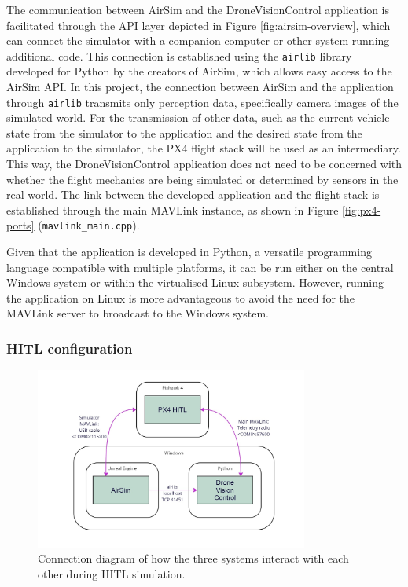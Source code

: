 The communication between AirSim and the DroneVisionControl application is facilitated through the API layer depicted in Figure \ref{fig:airsim-overview}, which can connect the simulator with a companion computer or other system running additional code. This connection is established using the \texttt{airlib} library developed for Python by the creators of AirSim, which allows easy access to the AirSim API. In this project, the connection between AirSim and the application through \texttt{airlib} transmits only perception data, specifically camera images of the simulated world. 
For the transmission of other data, such as the current vehicle state from the simulator to the application and the desired state from the application to the simulator, the PX4 flight stack will be used as an intermediary. This way, the DroneVisionControl application does not need to be concerned with whether the flight mechanics are being simulated or determined by sensors in the real world. The link between the developed application and the flight stack is established through the main MAVLink instance, as shown in Figure \ref{fig:px4-ports} (\texttt{mavlink\_main.cpp}).

Given that the application is developed in Python, a versatile programming language compatible with multiple platforms, it can be run either on the central Windows system or within the virtualised Linux subsystem. However, running the application on Linux is more advantageous to avoid the need for the MAVLink server to broadcast to the Windows system.



\subsubsection{HITL configuration}

\begin{figure}
  \centering
  \includegraphics[width=0.8\textwidth,keepaspectratio]{img/hitl-connections.jpg}
  \caption{Connection diagram of how the three systems interact with each other during HITL simulation.}\label{fig:hitl-connections}
\end{figure}

